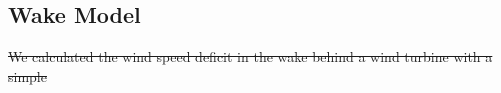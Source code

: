 \documentclass[wes, manuscript]{copernicus}
\providecommand{\DIFdel}[1]{{\protect\color{red}\sout{#1}}}                      %
\providecommand{\DIFaddbegin}{} %
\providecommand{\DIFdelbegin}{} %
\providecommand{\DIFdelend}{} %
\begin{document}
\subsection{Wake Model}
\DIFdelbegin \DIFdel{We calculated the wind speed deficit in the wake behind a wind turbine with a simple }\DIFdelend %
\DIFaddbegin 
\end{document}
